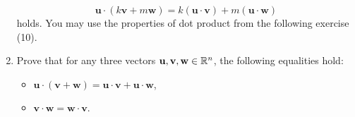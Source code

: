 \begin{enumerate}
 \[
  \mathbf{u} \cdot (k \mathbf{v} + m \mathbf{w}) = k (\mathbf{u} \cdot
  \mathbf{v}) + m(\mathbf{u} \cdot \mathbf{w})
 \]
 holds. You may use the properties of dot product from the following exercise
 (10).
\item 
 Prove that for any three vectors $\mathbf{u},\mathbf{v},\mathbf{w} \in \mathbb{R}^{n}$,
 the following equalities hold:
 \begin{itemize}
  \item $\mathbf{u} \cdot (\mathbf{v} + \mathbf{w}) = \mathbf{u} \cdot
   \mathbf{v} + \mathbf{u} \cdot \mathbf{w}$,
  \item $\mathbf{v} \cdot \mathbf{w} = \mathbf{w} \cdot \mathbf{v}$.
 \end{itemize}
\end{enumerate}

\section*{}

